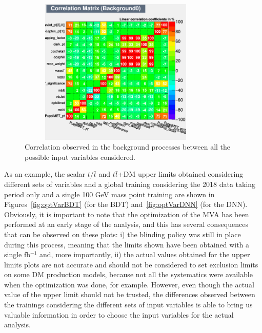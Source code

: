 \documentclass[a4paper, 10pt, openright]{report}
\begin{document}
\begin{appendices}
\begin{figure}[htbp]
\centering
\includegraphics[width=9.4cm, height=7cm]{figs/corr_allVariables_bkg.png}
\caption{Correlation observed in the background processes between all the possible input variables considered.}
\label{fig:allVarCorr_bkg}
\end{figure}

%

As an example, the scalar $t/\bar t$ and $t \bar t$+DM upper limits obtained considering different sets of variables and a global training considering the 2018 data taking period only and a single 100 GeV mass point training are shown in Figures~\ref{fig:optVarBDT} (for the \ac{BDT}) and~\ref{fig:optVarDNN} (for the \ac{DNN}). Obviously, it is important to note that the optimization of the \ac{MVA} has been performed at an early stage of the analysis, and this has several consequences that can be observed on these plots: i) the blinding policy was still in place during this process, meaning that the limits shown have been obtained with a single fb$^{-1}$ and, more importantly, ii) the actual values obtained for the upper limits plots are not accurate and should not be considered to set exclusion limits on some \ac{DM} production models, because not all the systematics were available when the optimization was done, for example. However, even though the actual value of the upper limit should not be trusted, the differences observed between the trainings considering the different sets of input variables is able to bring us valuable information in order to choose the input variables for the actual analysis.


\end{appendices}
\end{document}
